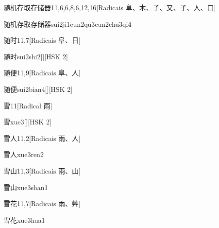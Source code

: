 \begin{entry}{随机存取存储器}{11,6,6,8,6,12,16}[Radicais ⾩、⽊、⼦、⼜、⼦、⼈、⼝]
  \begin{phonetics}{随机存取存储器}{sui2ji1cun2qu3cun2chu3qi4}
  \end{phonetics}
\end{entry}

\begin{entry}{随时}{11,7}[Radicais ⾩、⽇]
  \begin{phonetics}{随时}{sui2shi2}[][HSK 2]
  \end{phonetics}
\end{entry}

\begin{entry}{随便}{11,9}[Radicais ⾩、⼈]
  \begin{phonetics}{随便}{sui2bian4}[][HSK 2]
  \end{phonetics}
\end{entry}

\begin{entry}{雪}{11}[Radical ⾬]
  \begin{phonetics}{雪}{xue3}[][HSK 2]
  \end{phonetics}
\end{entry}

\begin{entry}{雪人}{11,2}[Radicais ⾬、⼈]
  \begin{phonetics}{雪人}{xue3ren2}
  \end{phonetics}
\end{entry}

\begin{entry}{雪山}{11,3}[Radicais ⾬、⼭]
  \begin{phonetics}{雪山}{xue3shan1}
  \end{phonetics}
\end{entry}

\begin{entry}{雪花}{11,7}[Radicais ⾬、⾋]
  \begin{phonetics}{雪花}{xue3hua1}
  \end{phonetics}
\end{entry}


